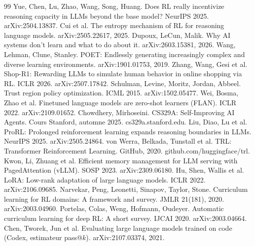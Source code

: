 \documentclass[11pt,a4paper]{article}
\begin{document}
\begin{thebibliography}{99}
 Yue, Chen, Lu, Zhao, Wang, Song, Huang. Does RL really incentivize reasoning capacity in LLMs beyond the base model? NeurIPS 2025. arXiv:2504.13837.
 Cui et al. The entropy mechanism of RL for reasoning language models. arXiv:2505.22617, 2025.
 Dupoux, LeCun, Malik. Why AI systems don't learn and what to do about it. arXiv:2603.15381, 2026.
 Wang, Lehman, Clune, Stanley. POET: Endlessly generating increasingly complex and diverse learning environments. arXiv:1901.01753, 2019.
 Zhang, Wang, Gesi et al. Shop-R1: Rewarding LLMs to simulate human behavior in online shopping via RL. ICLR 2026. arXiv:2507.17842.
 Schulman, Levine, Moritz, Jordan, Abbeel. Trust region policy optimization. ICML 2015. arXiv:1502.05477.
 Wei, Bosma, Zhao et al. Finetuned language models are zero-shot learners (FLAN). ICLR 2022. arXiv:2109.01652.
 Chowdhery, Mirhoseini. CS329A: Self-Improving AI Agents. Cours Stanford, automne 2025. cs329a.stanford.edu.
 Liu, Diao, Lu et al. ProRL: Prolonged reinforcement learning expands reasoning boundaries in LLMs. NeurIPS 2025. arXiv:2505.24864.
 von Werra, Belkada, Tunstall et al. TRL: Transformer Reinforcement Learning. GitHub, 2020. github.com/huggingface/trl.
 Kwon, Li, Zhuang et al. Efficient memory management for LLM serving with PagedAttention (vLLM). SOSP 2023. arXiv:2309.06180.
 Hu, Shen, Wallis et al. LoRA: Low-rank adaptation of large language models. ICLR 2022. arXiv:2106.09685.
 Narvekar, Peng, Leonetti, Sinapov, Taylor, Stone. Curriculum learning for RL domains: A framework and survey. JMLR 21(181), 2020. arXiv:2003.04960.
 Portelas, Colas, Weng, Hofmann, Oudeyer. Automatic curriculum learning for deep RL: A short survey. IJCAI 2020. arXiv:2003.04664.
 Chen, Tworek, Jun et al. Evaluating large language models trained on code (Codex, estimateur pass@$k$). arXiv:2107.03374, 2021.
\end{thebibliography}









\appendix



\newpage
\end{document}

